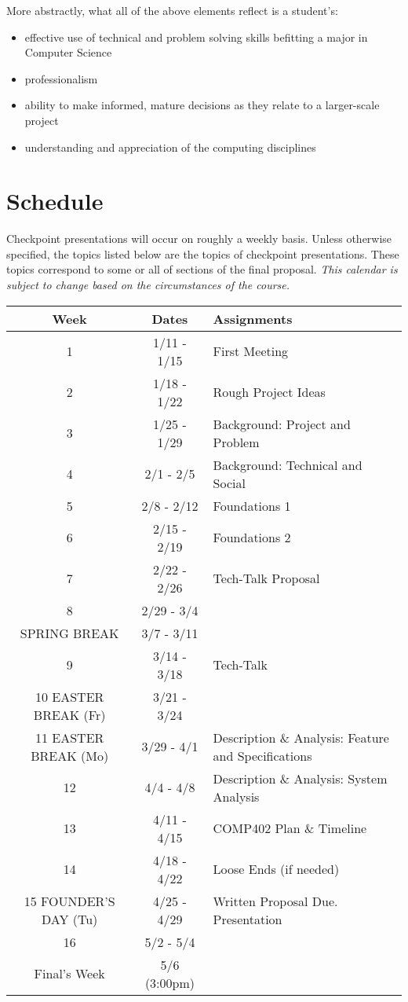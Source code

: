 \documentclass[10pt]{article}
\begin{document}
More abstractly, what all of the above elements reflect is a student's: 
\begin{itemize}
\item effective use of technical and problem solving skills befitting a major in Computer Science
\item professionalism
\item ability to make informed, mature decisions as they relate to a larger-scale project
\item understanding and appreciation of the computing disciplines
\end{itemize}


\section{Schedule}

Checkpoint presentations will occur on roughly a weekly basis. Unless otherwise specified, the topics listed below are the topics of checkpoint presentations. These topics correspond to some or all of sections of the final proposal. \textit{This calendar is subject to change based on the circumstances of the course.}

\begin{center}
\begin{tabular}{|c|c|l|}
\hline 
Week & Dates & Assignments\\
\hline
1 & 1/11 - 1/15 &  First Meeting \\
\hline
2 & 1/18 - 1/22 & Rough Project Ideas \\
\hline
3 & 1/25 - 1/29 & Background: Project and Problem  \\
\hline
4 & 2/1 - 2/5 & Background: Technical and Social   \\
\hline
5 & 2/8 - 2/12 & Foundations 1 \\
\hline
6 & 2/15 - 2/19 & Foundations 2  \\
\hline
7 & 2/22 - 2/26 &  Tech-Talk Proposal  \\
\hline
8 & 2/29 - 3/4 &   \\
\hline 
SPRING BREAK & 3/7 - 3/11 &  \\
\hline
9 & 3/14 - 3/18 &  Tech-Talk \\
\hline
10 EASTER BREAK (Fr)& 3/21 - 3/24 & \\
\hline
11 EASTER BREAK (Mo)& 3/29 - 4/1 & Description \& Analysis: Feature and Specifications\\
\hline
12 & 4/4 - 4/8 & Description \& Analysis: System Analysis  \\
\hline
13 & 4/11 - 4/15 &  COMP402 Plan \& Timeline  \\
\hline
14 & 4/18 - 4/22 &  Loose Ends (if needed) \\
\hline
15 FOUNDER'S DAY (Tu) & 4/25 - 4/29 & Written Proposal Due. Presentation\\ 
\hline
16 & 5/2 - 5/4 & \\
\hline
Final's Week & 5/6 (3:00pm) &  \\ 
\hline
\end{tabular}
\end{center}
\end{document}
